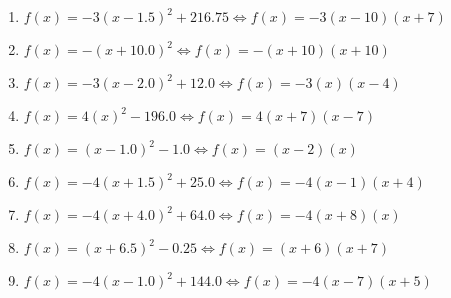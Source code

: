 \documentclass{article}%
\begin{document}
\begin{enumerate}[label=\alph*)]
\item%
\newline\vspace{0.5cm}$f(x)=-3(x-1.5)^2 +216.75\Leftrightarrow f(x)=-3(x-10)(x+7)$%
\item%
\newline\vspace{0.5cm}$f(x)=-(x+10.0)^2\Leftrightarrow f(x)=-(x+10)(x+10)$%
\item%
\newline\vspace{0.5cm}$f(x)=-3(x-2.0)^2 +12.0\Leftrightarrow f(x)=-3(x)(x-4)$%
\item%
\newline\vspace{0.5cm}$f(x)=4(x)^2 -196.0\Leftrightarrow f(x)=4(x+7)(x-7)$%
\item%
\newline\vspace{0.5cm}$f(x)=(x-1.0)^2 -1.0\Leftrightarrow f(x)=(x-2)(x)$%
\item%
\newline\vspace{0.5cm}$f(x)=-4(x+1.5)^2 +25.0\Leftrightarrow f(x)=-4(x-1)(x+4)$%
\item%
\newline\vspace{0.5cm}$f(x)=-4(x+4.0)^2 +64.0\Leftrightarrow f(x)=-4(x+8)(x)$%
\item%
\newline\vspace{0.5cm}$f(x)=(x+6.5)^2 -0.25\Leftrightarrow f(x)=(x+6)(x+7)$%
\item%
\newline\vspace{0.5cm}$f(x)=-4(x-1.0)^2 +144.0\Leftrightarrow f(x)=-4(x-7)(x+5)$%
\end{enumerate}

%
\end{document}
